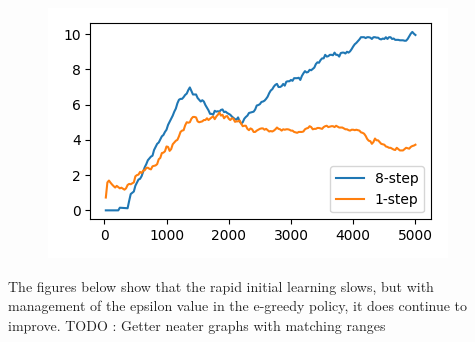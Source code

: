 \documentclass{article}
\begin{document}
\begin{figure}[H]
\includegraphics[scale=0.4]{"async_q_learn_n_step"}
\end{figure}

The figures below show that the rapid initial learning slows, but with management of the epsilon value in the e-greedy policy, it does continue to improve.
TODO : Getter neater graphs with matching ranges
\end{document}
